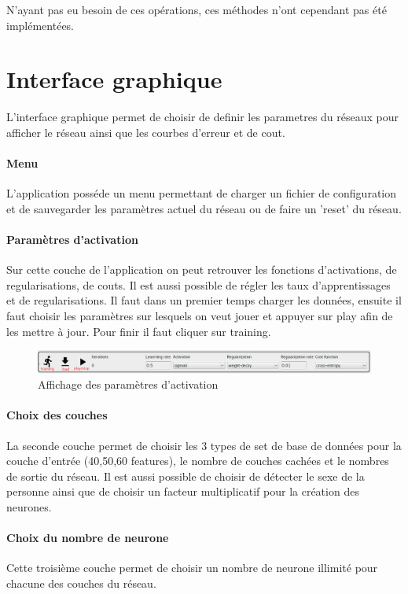 \documentclass[11pt]{article}
\begin{document}
N'ayant pas eu besoin de ces op\'erations, ces m\'ethodes n'ont
cependant pas \'et\'e impl\'ement\'ees.

\newpage
\section{Interface graphique}

L'interface graphique permet de choisir de definir les parametres du r\'eseaux
pour afficher le r\'eseau ainsi que les courbes d'erreur et de cout.
\paragraph{Menu} L'application poss\'ede un menu permettant de charger un
fichier de configuration et de sauvegarder les param\`etres actuel du r\'eseau
ou de faire un 'reset' du r\'eseau.

\paragraph{Param\`etres d'activation} Sur cette couche de l'application on
peut retrouver les fonctions d'activations, de regularisations, de couts.
Il est aussi possible de r\'egler les taux d'apprentissages et de
regularisations. Il faut dans un premier temps charger les donn\'ees, ensuite il faut choisir
les param\`etres sur lesquels on veut jouer et appuyer sur play afin de les
mettre \`a jour. Pour finir il faut cliquer sur training.
\begin{figure}[htp]
	\centering
	\includegraphics[scale=.4]{img/parametersLayer.png}
	\caption{Affichage des param\`etres d'activation}
\end{figure}

\paragraph{Choix des couches} La seconde couche permet de choisir les 3 types
de set de base de donn\'ees pour la couche d'entr\'ee (40,50,60 features), le
nombre de couches cach\'ees et le nombres de sortie du r\'eseau. Il est aussi
possible de choisir de d\'etecter le sexe de la personne ainsi que de choisir
un facteur multiplicatif pour la cr\'eation des neurones.

\paragraph{Choix du nombre de neurone} Cette troisi\`eme couche permet de
choisir un nombre de neurone illimit\'e pour chacune des couches du r\'eseau.
\end{document}
